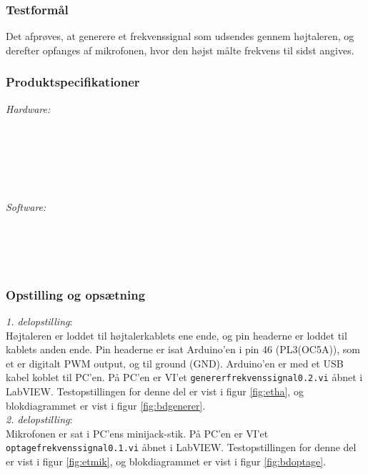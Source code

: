 		\subsubsection{Testformål}
		Det afprøves, at generere et frekvenssignal som udsendes gennem højtaleren, og derefter opfanges af mikrofonen, hvor den højst målte frekvens til sidst angives.  
		\subsubsection{Produktspecifikationer}
		
		\textit{Hardware:}\\
		\\
		\hojtalerkabel\\
		\pins\\
		\arduino\\
		\PC\\
		\usbkabel\\
	
		\textit{Software:}\\
		\labview\\
		\visa\\
		\vi\\
		\ardsw\
		
		\subsubsection{Opstilling og opsætning}
		\textit{1. delopstilling}:\\
		Højtaleren er loddet til højtalerkablets ene ende, og pin headerne er loddet til kablets anden ende. 
		Pin headerne er isat Arduino'en i pin 46 (PL3(OC5A)), som et er digitalt PWM output, og til ground (GND). 
		Arduino'en er med et USB kabel koblet til PC'en. 		
		På PC'en er VI'et \texttt{genererfrekvenssignal0.2.vi} åbnet i LabVIEW. Testopstillingen for denne del er vist i figur \ref{fig:etha}, og blokdiagrammet er vist i figur \ref{fig:bdgenerer}.\\ 
 
		\textit{2. delopstilling}:\\
		Mikrofonen er sat i PC'ens minijack-stik. På PC'en er VI'et \texttt{optagefrekvenssignal0.1.vi} åbnet i LabVIEW. Testopstillingen for denne del er vist i figur \ref{fig:etmik}, og blokdiagrammet er vist i figur \ref{fig:bdoptage}.\\ 
		
